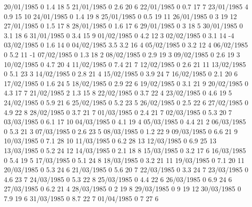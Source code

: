 20/01/1985  0      1.4    18     5 
21/01/1985  0      2.6    20     6 
22/01/1985  0      0.7    17     7 
23/01/1985  4      0.9    15     10 
24/01/1985  0      1.4    19     8 
25/01/1985  0      0.5    19     11 
26/01/1985  0      3      19     12 
27/01/1985  0      1.5    17     8 
28/01/1985  0      1.6    17     6 
29/01/1985  0      3      18     5 
30/01/1985  0      3.1    18     6 
31/01/1985  0      3.4    15     9 
01/02/1985  0      4.2    12     3 
02/02/1985  0      3.1    14    -4 
03/02/1985  0      1.6    14     0 
04/02/1985  3.5    3.2    16     4 
05/02/1985  0      3.2    12     4 
06/02/1985  0      5.2    11    -1 
07/02/1985  0      1.3    18     2 
08/02/1985  0      2.9    19     3 
09/02/1985  0      2.6    19     3 
10/02/1985  0      4.7    20     4 
11/02/1985  0      7.4    21     7 
12/02/1985  0      2.6    21     11 
13/02/1985  0      5.1    23     3 
14/02/1985  0      2.8    21     4 
15/02/1985  0      3.9    24     7 
16/02/1985  0      2.1    20     6 
17/02/1985  0      1.6    24     5 
18/02/1985  0      2.9    22     6 
19/02/1985  0      3.1    21     9 
20/02/1985  0      4.3    17     7 
21/02/1985  2      1.3    15     8 
22/02/1985  0      3.7    22     4 
23/02/1985  0      4.6    19     5 
24/02/1985  0      5.9    21     6 
25/02/1985  0      5.2    23     5 
26/02/1985  0      2.5    22     6 
27/02/1985  0      4.9    22     8 
28/02/1985  0      3.7    21     7 
01/03/1985  0      2.4    21     7 
02/03/1985  0      5.3    20     7 
03/03/1985  0      6.1    17     10 
04/03/1985  0      4.1    19     4 
05/03/1985  0      4.4    21     2 
06/03/1985  0      5.3    21     3 
07/03/1985  0      2.6    23     5 
08/03/1985  0      1.2    22     9 
09/03/1985  0      6.6    21     9 
10/03/1985  0      7.1    28     10 
11/03/1985  0      6.2    28     13 
12/03/1985  0      6.9    25     13 
13/03/1985  0      5.2    24     12 
14/03/1985  0      2.1    18     8 
15/03/1985  0      3.2    17     6 
16/03/1985  0      5.4    19     5 
17/03/1985  0      5.1    24     8 
18/03/1985  0      3.2    21     11 
19/03/1985  0      7.1    20     11 
20/03/1985  0      5.3    24     6 
21/03/1985  0      5.6    20     7 
22/03/1985  0      3.3    24     7 
23/03/1985  0      4.6    23     7 
24/03/1985  0      5.3    22     8 
25/03/1985  0      4.4    22     6 
26/03/1985  0      6.9    24     6 
27/03/1985  0      6.2    21     4 
28/03/1985  0      2      19     8 
29/03/1985  0      9      19     12 
30/03/1985  0      7.9    19     6 
31/03/1985  0      8.7    22     7 
01/04/1985  0      7      27     6 
